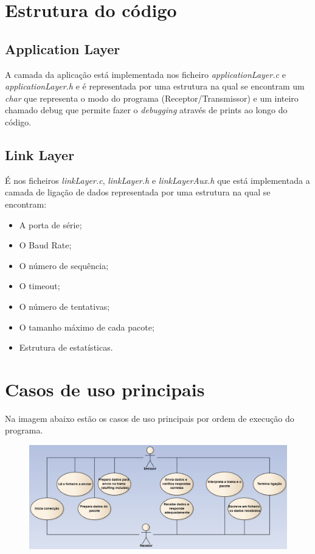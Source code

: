 \documentclass[11pt]{article}
\begin{document}
\section{Estrutura do código}

\subsection{Application Layer}
 
  A camada da aplicação está implementada nos ficheiro \textit{applicationLayer.c} e \textit{applicationLayer.h} e é representada por uma estrutura na qual se encontram um \textit{char} que representa o modo do programa (Receptor/Transmissor) e um inteiro chamado debug que permite fazer o \textit{debugging} através de prints ao longo do código.
 
\small

\normalsize

\subsection{Link Layer}
 
 É nos ficheiros \textit{linkLayer.c}, \textit{linkLayer.h} e \textit{linkLayerAux.h} que está implementada a camada de ligação de dados representada por uma estrutura na qual se encontram:

\begin{itemize}
  \item A porta de série;
   \item O Baud Rate;
   \item O número de sequência;
   \item O timeout;
   \item O número de tentativas;
   \item O tamanho máximo de cada pacote;
   \item Estrutura de estatísticas.
\end{itemize}

\small

\normalsize

\section{Casos de uso principais}
 
Na imagem abaixo estão os casos de uso principais por ordem de execução do programa.
\begin{figure}[h!]
\begin{center}
\includegraphics[scale=0.43]{useCases.png}
\label{fig:codigoFigura}
\end{center}
\end{figure}
\end{document}
